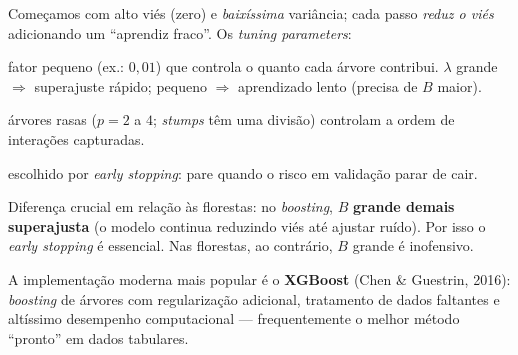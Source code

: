 \documentclass[11pt,a4paper]{article}
\begin{document}
Começamos com alto viés (zero) e \emph{baixíssima} variância; cada passo
\emph{reduz o viés} adicionando um ``aprendiz fraco''. Os \emph{tuning parameters}:
\begin{description}[leftmargin=2.4cm,style=nextline]
  \item[$\lambda$ (\emph{learning rate})] fator pequeno (ex.: $0{,}01$) que
        controla o quanto cada árvore contribui. $\lambda$ grande $\Rightarrow$
        superajuste rápido; pequeno $\Rightarrow$ aprendizado lento (precisa de $B$
        maior).
  \item[$p$ (profundidade/folhas)] árvores rasas ($p=2$ a $4$; \emph{stumps} têm
        uma divisão) controlam a ordem de interações capturadas.
  \item[$B$ (número de árvores)] escolhido por \emph{early stopping}: pare quando o
        risco em validação parar de cair.
\end{description}

\begin{atencao}
Diferença crucial em relação às florestas: no \emph{boosting}, $B$ \textbf{grande
demais superajusta} (o modelo continua reduzindo viés até ajustar ruído). Por isso
o \emph{early stopping} é essencial. Nas florestas, ao contrário, $B$ grande é
inofensivo.
\end{atencao}

\begin{observacao}
A implementação moderna mais popular é o \textbf{XGBoost} (Chen \& Guestrin, 2016):
\emph{boosting} de árvores com regularização adicional, tratamento de dados
faltantes e altíssimo desempenho computacional --- frequentemente o melhor método
``pronto'' em dados tabulares.
\end{observacao}

\end{document}
